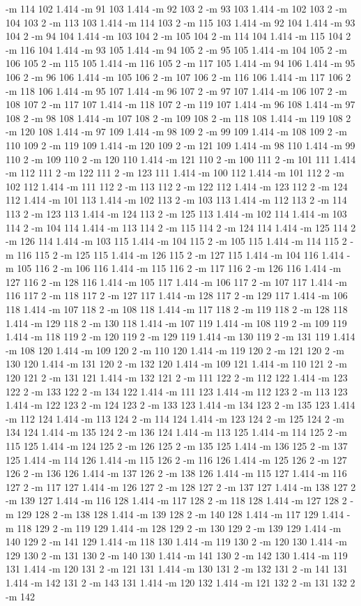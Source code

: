 \documentclass[12pt]{article}
\begin{document}
-m 114 102 1.414 -m 91 103 1.414 -m 92 103 2 -m 93 103 1.414 -m 102 103 2 -m 104 103 2 -m 113 103 1.414 -m 114 103 2 -m 115 103 1.414 -m 92 104 1.414 -m 93 104 2 -m 94 104 1.414 -m 103 104 2 -m 105 104 2 -m 114 104 1.414 -m 115 104 2 -m 116 104 1.414 -m 93 105 1.414 -m 94 105 2 -m 95 105 1.414 -m 104 105 2 -m 106 105 2 -m 115 105 1.414 -m 116 105 2 -m 117 105 1.414 -m 94 106 1.414 -m 95 106 2 -m 96 106 1.414 -m 105 106 2 -m 107 106 2 -m 116 106 1.414 -m 117 106 2 -m 118 106 1.414 -m 95 107 1.414 -m 96 107 2 -m 97 107 1.414 -m 106 107 2 -m 108 107 2 -m 117 107 1.414 -m 118 107 2 -m 119 107 1.414 -m 96 108 1.414 -m 97 108 2 -m 98 108 1.414 -m 107 108 2 -m 109 108 2 -m 118 108 1.414 -m 119 108 2 -m 120 108 1.414 -m 97 109 1.414 -m 98 109 2 -m 99 109 1.414 -m 108 109 2 -m 110 109 2 -m 119 109 1.414 -m 120 109 2 -m 121 109 1.414 -m 98 110 1.414 -m 99 110 2 -m 109 110 2 -m 120 110 1.414 -m 121 110 2 -m 100 111 2 -m 101 111 1.414 -m 112 111 2 -m 122 111 2 -m 123 111 1.414 -m 100 112 1.414 -m 101 112 2 -m 102 112 1.414 -m 111 112 2 -m 113 112 2 -m 122 112 1.414 -m 123 112 2 -m 124 112 1.414 -m 101 113 1.414 -m 102 113 2 -m 103 113 1.414 -m 112 113 2 -m 114 113 2 -m 123 113 1.414 -m 124 113 2 -m 125 113 1.414 -m 102 114 1.414 -m 103 114 2 -m 104 114 1.414 -m 113 114 2 -m 115 114 2 -m 124 114 1.414 -m 125 114 2 -m 126 114 1.414 -m 103 115 1.414 -m 104 115 2 -m 105 115 1.414 -m 114 115 2 -m 116 115 2 -m 125 115 1.414 -m 126 115 2 -m 127 115 1.414 -m 104 116 1.414 -m 105 116 2 -m 106 116 1.414 -m 115 116 2 -m 117 116 2 -m 126 116 1.414 -m 127 116 2 -m 128 116 1.414 -m 105 117 1.414 -m 106 117 2 -m 107 117 1.414 -m 116 117 2 -m 118 117 2 -m 127 117 1.414 -m 128 117 2 -m 129 117 1.414 -m 106 118 1.414 -m 107 118 2 -m 108 118 1.414 -m 117 118 2 -m 119 118 2 -m 128 118 1.414 -m 129 118 2 -m 130 118 1.414 -m 107 119 1.414 -m 108 119 2 -m 109 119 1.414 -m 118 119 2 -m 120 119 2 -m 129 119 1.414 -m 130 119 2 -m 131 119 1.414 -m 108 120 1.414 -m 109 120 2 -m 110 120 1.414 -m 119 120 2 -m 121 120 2 -m 130 120 1.414 -m 131 120 2 -m 132 120 1.414 -m 109 121 1.414 -m 110 121 2 -m 120 121 2 -m 131 121 1.414 -m 132 121 2 -m 111 122 2 -m 112 122 1.414 -m 123 122 2 -m 133 122 2 -m 134 122 1.414 -m 111 123 1.414 -m 112 123 2 -m 113 123 1.414 -m 122 123 2 -m 124 123 2 -m 133 123 1.414 -m 134 123 2 -m 135 123 1.414 -m 112 124 1.414 -m 113 124 2 -m 114 124 1.414 -m 123 124 2 -m 125 124 2 -m 134 124 1.414 -m 135 124 2 -m 136 124 1.414 -m 113 125 1.414 -m 114 125 2 -m 115 125 1.414 -m 124 125 2 -m 126 125 2 -m 135 125 1.414 -m 136 125 2 -m 137 125 1.414 -m 114 126 1.414 -m 115 126 2 -m 116 126 1.414 -m 125 126 2 -m 127 126 2 -m 136 126 1.414 -m 137 126 2 -m 138 126 1.414 -m 115 127 1.414 -m 116 127 2 -m 117 127 1.414 -m 126 127 2 -m 128 127 2 -m 137 127 1.414 -m 138 127 2 -m 139 127 1.414 -m 116 128 1.414 -m 117 128 2 -m 118 128 1.414 -m 127 128 2 -m 129 128 2 -m 138 128 1.414 -m 139 128 2 -m 140 128 1.414 -m 117 129 1.414 -m 118 129 2 -m 119 129 1.414 -m 128 129 2 -m 130 129 2 -m 139 129 1.414 -m 140 129 2 -m 141 129 1.414 -m 118 130 1.414 -m 119 130 2 -m 120 130 1.414 -m 129 130 2 -m 131 130 2 -m 140 130 1.414 -m 141 130 2 -m 142 130 1.414 -m 119 131 1.414 -m 120 131 2 -m 121 131 1.414 -m 130 131 2 -m 132 131 2 -m 141 131 1.414 -m 142 131 2 -m 143 131 1.414 -m 120 132 1.414 -m 121 132 2 -m 131 132 2 -m 142 
\end{document}
